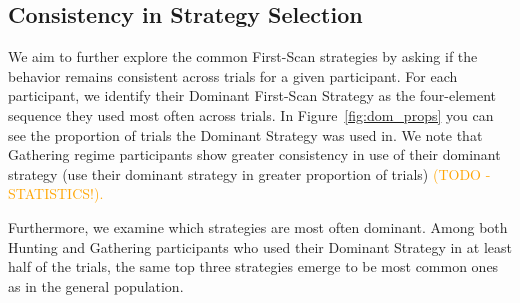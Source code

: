 \documentclass[manuscript,review,anonymous]{acmart}
\begin{document}
    \subsection{Consistency in Strategy Selection}   
    We aim to further explore the common First-Scan strategies by asking if the behavior remains consistent across trials for a given participant. For each participant, we identify their Dominant First-Scan Strategy as the four-element sequence they used most often across trials. In Figure~\ref{fig:dom_props} you can see the proportion of trials the Dominant Strategy was used in. We note that Gathering regime participants show greater consistency in use of their dominant strategy (use their dominant strategy in greater proportion of trials) \textcolor{orange}{(TODO - STATISTICS!).} 

    Furthermore, we examine which strategies are most often dominant. Among both Hunting and Gathering participants who used their Dominant Strategy in at least half of the trials, the same top three strategies emerge to be most common ones as in the general population.
\end{document}
